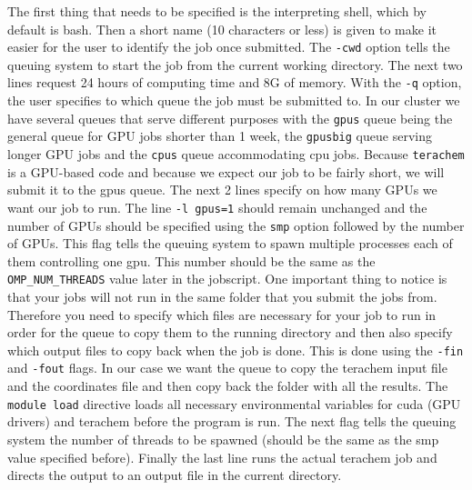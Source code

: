 \documentclass[a4paper,12pt]{assignment}
\begin{document}
The first thing that needs to be specified is the interpreting shell, which by default is bash. Then a short name (10 characters or less) is given to make it easier for the user to identify the job once submitted. The \texttt{-cwd} option tells the queuing system to start the job from the current working directory. The next two lines request 24 hours of computing time and 8G of memory. With the \texttt{-q} option, the user specifies to which queue the job must be submitted to. In our cluster we have several queues that serve different purposes with the \texttt{gpus} queue being the general queue for GPU jobs shorter than 1 week, the \texttt{gpusbig} queue serving longer GPU jobs and the \texttt{cpus} queue accommodating cpu jobs. Because \texttt{terachem} is a GPU-based code and because we expect our job to be fairly short, we will submit it to the gpus queue. The next 2 lines specify on how many GPUs we want our job to run. The line \texttt{-l gpus=1} should remain unchanged and the number of GPUs should be specified using the \texttt{smp} option followed by the number of GPUs. This flag tells the queuing system to spawn multiple processes each of them controlling one gpu. This number should be the same as the \texttt{OMP\_NUM\_THREADS} value later in the jobscript. One important thing to notice is that your jobs will not run in the same folder that you submit the jobs from. Therefore you need to specify which files are necessary for your job to run in order for the queue to copy them to the running directory and then also specify which output files to copy back when the job is done. This is done using the \texttt{-fin} and \texttt{-fout} flags. In our case we want the queue to copy the terachem input file and the coordinates file and then copy back the folder with all the results. The \texttt{module load} directive loads all necessary environmental variables for cuda (GPU drivers) and terachem before the program is run. The next flag tells the queuing system the number of threads to be spawned (should be the same as the smp value specified before). Finally the last line runs the actual terachem job and directs the output to an output file in the current directory. 

\end{document}
